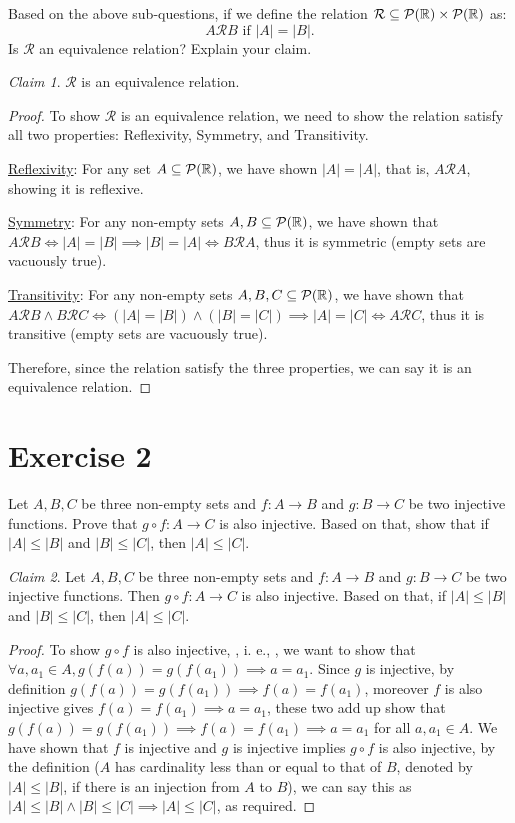 \documentclass{homework}
\newcommand{\T}[1]{\text{#1}}
\newcommand*{\ie}{\leavevmode\unskip, i. e., \ignorespaces} %
\newcommand{\R}{\bb{R}} %
\newcommand{\Relate}[2]{#1\mathcal{R}#2} %
\newcommand{\?}{\stackrel{?}{=}}
\theoremstyle{remark}
\newtheorem*{claim}{Claim}
\begin{document}
\question Based on the above sub-questions, if we define the relation $\mathcal{R}\subseteq\mathcal{P}(\R)\times\mathcal{P}(\R)$ as: $$A\mathcal{R}B \T{ if } |A|=|B|.$$ Is $\mathcal{R}$ an equivalence relation? Explain your claim. 
\begin{claim}
    $\mathcal{R}$ is an equivalence relation.
\end{claim}
\begin{proof}
    To show $\mathcal{R}$ is an equivalence relation, we need to show the relation satisfy all two properties: Reflexivity, Symmetry, and Transitivity.

    \underline{Reflexivity}: For any set $A\subseteq\mathcal{P}(\R)$, we have shown $|A|=|A|$, that is, $A\mathcal{R}A$, showing it is reflexive. 

    \underline{Symmetry}: For any non-empty sets $A, B\subseteq\mathcal{P}(\R)$, we have shown that $A\mathcal{R}B\iff |A|=|B|  \implies |B|=|A|\iff B\mathcal{R}A$, thus it is symmetric (empty sets are vacuously true).

    \underline{Transitivity}: For any non-empty sets $A,B,C\subseteq\mathcal{P}(\R)$, we have shown that $\Relate{A}{B}\land\Relate{B}{C}\iff(|A|=|B|)\land (|B|=|C|)\implies |A|=|C|\iff\Relate{A}{C}$, thus it is transitive (empty sets are vacuously true).

    Therefore, since the relation satisfy the three properties, we can say it is an equivalence relation. 
\end{proof}

\newpage
\section*{Exercise 2}
\question[1] Let $A,B,C$ be three non-empty sets and $f:A\rightarrow B$ and $g: B\rightarrow C$ be two injective functions. Prove that $g\circ f:A\rightarrow C$ is also injective. Based on that, show that if $|A|\leq|B|$ and $|B|\leq|C|$, then $|A|\leq|C|$.  
\begin{claim}
    Let $A,B,C$ be three non-empty sets and $f:A\rightarrow B$ and $g: B\rightarrow C$ be two injective functions. Then $g\circ f:A\rightarrow C$ is also injective. Based on that, if $|A|\leq|B|$ and $|B|\leq|C|$, then $|A|\leq|C|$.  
\end{claim}
\begin{proof}
    To show $g\circ f$ is also injective, \ie, we want to show that $\forall a,a_1\in A, g(f(a))=g(f(a_1))\implies a=a_1$. Since $g$ is injective, by definition $g(f(a))=g(f(a_1))\implies f(a)=f(a_1)$, moreover $f$ is also injective gives $f(a)=f(a_1)\implies a=a_1$, these two add up show that $g(f(a))=g(f(a_1))\implies f(a)=f(a_1)\implies a=a_1$ for all $a,a_1\in A$.  We have shown that $f$ is injective and $g$ is injective implies $g\circ f$ is also injective, by the definition ($A$ has cardinality less than or equal to that of $B$, denoted by $|A|\leq|B|$, if there is an injection from $A$ to $B$), we can say this as $|A|\leq|B|\land|B|\leq|C|\implies|A|\leq|C|$, as required. 
\end{proof}
\end{document}
